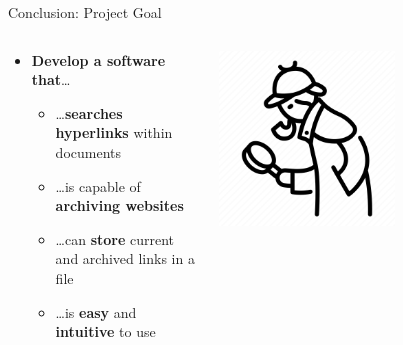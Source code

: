 \documentclass[
    ngerman,%
    authorontitle=true,
]{bfhbeamer}
\begin{document}
    \begin{frame}{Conclusion: Project Goal}
        \begin{columns} %
            \begin{column}{0.5\textwidth} %
                \begin{itemize}
                    \item[\checkmark] \textbf{Develop a software that}\ldots
                    \begin{itemize}
                        \item[\checkmark] \ldots \textbf{searches hyperlinks} within documents
                        \item[\checkmark] \ldots is capable of \textbf{archiving websites}
                        \item[\checkmark] \ldots can \textbf{store} current and archived links in a file
                        \item[\checkmark] \ldots is \textbf{easy} and \textbf{intuitive} to use
                    \end{itemize}
                \end{itemize}
            \end{column}
            \begin{column}{0.3\textwidth} %
                \begin{center}
                    \includegraphics[width=0.6\textwidth]{pictures/sherlock}
                \end{center}
            \end{column}
        \end{columns}
    \end{frame}
\end{document}
